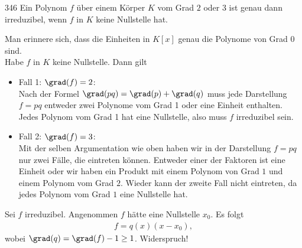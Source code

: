 \begin{algebraUE}{346}
Ein Polynom $f$ über einem Körper $K$ vom Grad $2$ oder $3$ ist genau dann
irreduzibel, wenn $f$ in $K$ keine Nullstelle hat.

\end{algebraUE}

\begin{solution}
Man erinnere sich, dass die Einheiten in $K[x]$ genau die Polynome von Grad $0$ sind. \\
Habe $f$ in $K$ keine Nullstelle. Dann gilt
\begin{itemize}
  \item Fall 1: $\grad(f) = 2$: \\
  Nach der Formel $\grad(pq) = \grad(p) + \grad(q)$ muss jede Darstellung $f = pq$
  entweder zwei Polynome vom Grad 1 oder eine Einheit enthalten. Jedes Polynom vom Grad
  1 hat eine Nullstelle, also muss $f$ irreduzibel sein.
  \item Fall 2: $\grad(f) = 3$: \\
  Mit der selben Argumentation wie oben haben wir in der Darstellung $f = pq$
  nur zwei Fälle, die eintreten können. Entweder einer der Faktoren ist eine
  Einheit oder wir haben ein Produkt mit einem Polynom von Grad $1$ und einem
  Polynom vom Grad $2$. Wieder kann der zweite Fall nicht eintreten, da jedes
  Polynom vom Grad $1$ eine Nullstelle hat.
\end{itemize}
Sei $f$ irreduzibel. Angenommen $f$ hätte eine Nullstelle $x_0$.
Es folgt
\begin{align*}
  f = q(x)(x - x_0),
\end{align*}
wobei $\grad(q) = \grad(f) - 1 \geq 1$. Widerspruch!
\end{solution}
